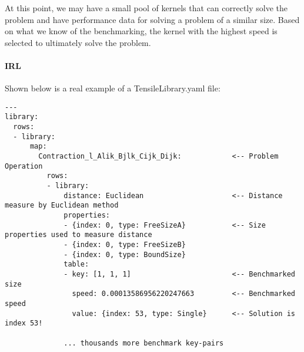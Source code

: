 \documentclass[]{article}
\begin{document}
At this point, we may have a small pool of kernels that can correctly solve the problem and have performance data for solving a problem of a similar size. Based on what we know of the benchmarking, the kernel with the highest speed is selected to ultimately solve the problem.

\paragraph{IRL}

Shown below is a real example of a TensileLibrary.yaml file:


\begin{verbatim}
---
library:
  rows:
  - library:
      map:
        Contraction_l_Alik_Bjlk_Cijk_Dijk:            <-- Problem Operation
          rows:
          - library:
              distance: Euclidean                     <-- Distance measure by Euclidean method
              properties:
              - {index: 0, type: FreeSizeA}           <-- Size properties used to measure distance
              - {index: 0, type: FreeSizeB}
              - {index: 0, type: BoundSize}
              table:
              - key: [1, 1, 1]                        <-- Benchmarked size
                speed: 0.00013586956220247663         <-- Benchmarked speed
                value: {index: 53, type: Single}      <-- Solution is index 53!

              ... thousands more benchmark key-pairs


\end{verbatim}
\end{document}
